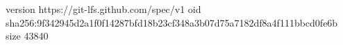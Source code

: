 version https://git-lfs.github.com/spec/v1
oid sha256:9f342945d2a1f0f14287bfd18b23cf348a3b07d75a7182df8a4f111bbcd0fe6b
size 43840
